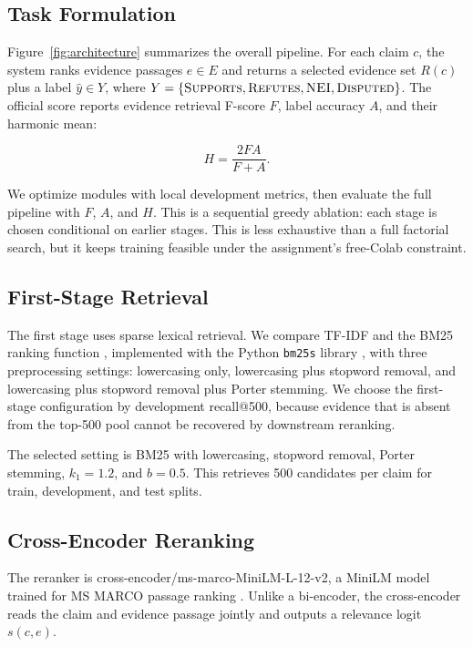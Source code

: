 \documentclass[11pt]{article}
\begin{document}
\subsection{Task Formulation}

Figure~\ref{fig:architecture} summarizes the overall pipeline. For each claim $c$, the system ranks evidence passages $e \in E$ and returns a selected evidence set $R(c)$ plus a label $\hat{y} \in Y$, where $Y=\{\textsc{Supports},\textsc{Refutes},\textsc{NEI},\textsc{Disputed}\}$. The official score reports evidence retrieval F-score $F$, label accuracy $A$, and their harmonic mean:

\begin{equation}
  H = \frac{2FA}{F + A}.
  \label{eq:harmonic}
\end{equation}

We optimize modules with local development metrics, then evaluate the full pipeline with $F$, $A$, and $H$. This is a sequential greedy ablation: each stage is chosen conditional on earlier stages. This is less exhaustive than a full factorial search, but it keeps training feasible under the assignment's free-Colab constraint.

\subsection{First-Stage Retrieval}

The first stage uses sparse lexical retrieval. We compare TF-IDF and the BM25 ranking function \citep{robertson2009probabilistic}, implemented with the Python \texttt{bm25s} library \citep{lu2024bm25s}, with three preprocessing settings: lowercasing only, lowercasing plus stopword removal, and lowercasing plus stopword removal plus Porter stemming. We choose the first-stage configuration by development recall@500, because evidence that is absent from the top-500 pool cannot be recovered by downstream reranking.

The selected setting is BM25 with lowercasing, stopword removal, Porter stemming, $k_1=1.2$, and $b=0.5$. This retrieves 500 candidates per claim for train, development, and test splits.

\subsection{Cross-Encoder Reranking}

The reranker is cross-encoder/ms-marco-MiniLM-L-12-v2, a MiniLM model \citep{wang2020minilm} trained for MS MARCO passage ranking \citep{bajaj2016msmarco}. Unlike a bi-encoder, the cross-encoder reads the claim and evidence passage jointly and outputs a relevance logit $s(c,e)$.
\end{document}
